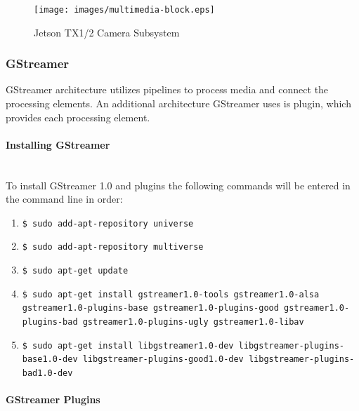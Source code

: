 \documentclass[letterpaper,10pt,serif,draftclsnofoot,onecolumn,compsoc,titlepage]{IEEEtran}
\begin{document}
	\begin{figure}[H]
		\centering
		\label{fig:MultimediaBlockDiagram}
		\texttt{[image: images/multimedia-block.eps]}
		\caption{Jetson TX1/2 Camera Subsystem\cite{CSubDia} \label{overflow}}
	\end{figure}

\subsubsection{GStreamer}

GStreamer architecture utilizes pipelines to process media and connect the processing 
elements. An additional architecture GStreamer uses is plugin, which provides each 
processing element. \\

\paragraph{Installing GStreamer}\mbox{} \\ 

To install GStreamer 1.0 and plugins the following commands will be entered in the 
command line in order\cite{GStmUG}: \\

	\begin{enumerate}
		\item\texttt{\$ sudo add-apt-repository universe} \\
		\item\texttt{\$ sudo add-apt-repository multiverse} \\
		\item\texttt{\$ sudo apt-get update} \\
		\item\texttt{\$ sudo apt-get install gstreamer1.0-tools gstreamer1.0-alsa 
			gstreamer1.0-plugins-base \newline gstreamer1.0-plugins-good 
			gstreamer1.0-plugins-bad gstreamer1.0-plugins-ugly \newline
			gstreamer1.0-libav} \\
		\item\texttt{\$ sudo apt-get install libgstreamer1.0-dev libgstreamer-plugins-base1.0-dev \newline
		libgstreamer-plugins-good1.0-dev libgstreamer-plugins-bad1.0-dev} \\
	\end{enumerate}

\paragraph{GStreamer Plugins}\mbox{} \\ 
\end{document}
